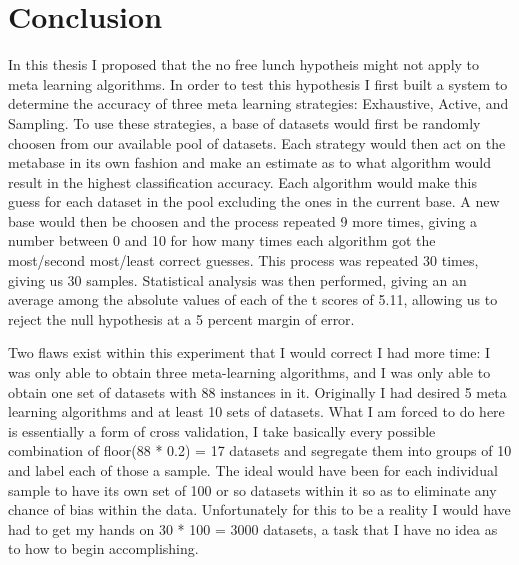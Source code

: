 \chapter{Conclusion}
\label{Chapter5}
In this thesis I proposed that the no free lunch hypotheis might not apply to
meta learning algorithms. In order to test this hypothesis I first built a
system to determine the accuracy of three meta learning strategies:
Exhaustive, Active, and Sampling. To use these strategies, a base of
datasets would first be randomly choosen from our available pool of datasets.
Each strategy would then act on the metabase in its own fashion and make an
estimate as to what algorithm would result in the highest classification accuracy.
Each algorithm would make this guess for each dataset in the pool excluding the
ones in the current base. A new base would then be choosen and the process
repeated 9 more times, giving a number between 0 and 10 for how many times
each algorithm got the most/second most/least correct guesses. This process
was repeated 30 times, giving us 30 samples. Statistical analysis was then
performed, giving an an average among the absolute values of each of the t scores
of 5.11, allowing us to reject the null hypothesis at a 5 percent margin of error.

Two flaws exist within this experiment that I would correct I had more time: I
was only able to obtain three meta-learning algorithms, and I was only able to
obtain one set of datasets with 88 instances in it. Originally I had desired 5
meta learning algorithms and at least 10 sets of datasets. What I am forced to
do here is essentially a form of cross validation, I take basically every
possible combination of floor(88 * 0.2) = 17 datasets and segregate them into
groups of 10 and label each of those a sample.  The ideal would have been for
each individual sample to have its own set of 100 or so datasets within it so
as to eliminate any chance of bias within the data. Unfortunately for this to be
a reality I would have had to get my hands on 30 * 100 = 3000 datasets, a task
that I have no idea as to how to begin accomplishing.
